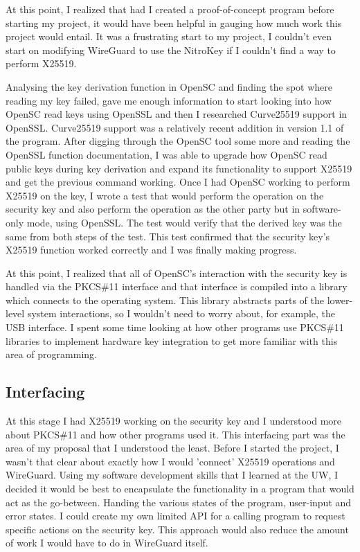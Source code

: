 \documentclass [11pt, proquest] {uwthesis}[2020/02/24]
\begin{document}
At this point, I realized that had I created a proof-of-concept program before starting my project, it would have been helpful in gauging how much work this project would entail. It was a frustrating start to my project, I couldn't even start on modifying WireGuard to use the NitroKey if I couldn't find a way to perform X25519.

Analysing the key derivation function in OpenSC and finding the spot where reading my key failed, gave me enough information to start looking into how OpenSC read keys using OpenSSL and then I researched Curve25519 support in OpenSSL. Curve25519 support was a relatively recent addition in version 1.1 of the program\cite{noauthor_support_nodate}.
After digging through the OpenSC tool some more and reading the OpenSSL function documentation, I was able to upgrade how OpenSC read public keys during key derivation and expand its functionality to support X25519 and get the previous command working.
Once I had OpenSC working to perform X25519 on the key, I wrote a test that would perform the operation on the security key and also perform the operation as the other party but in software-only mode, using OpenSSL. The test would verify that the derived key was the same from both steps of the test. This test confirmed that the security key's X25519 function worked correctly and I was finally making progress.

At this point, I realized that all of OpenSC's interaction with the security key is handled via the PKCS\#11 interface and that interface is compiled into a library which connects to the operating system. This library abstracts parts of the lower-level system interactions, so I wouldn't need to worry about, for example, the USB interface. I spent some time looking at how other programs use PKCS\#11 libraries to implement hardware key integration to get more familiar with this area of programming.

\subsection{Interfacing}
At this stage I had X25519 working on the security key and I understood more about PKCS\#11 and how other programs used it. This interfacing part was the area of my proposal that I understood the least. Before I started the project, I wasn't that clear about exactly how I would 'connect' X25519 operations and WireGuard. Using my software development skills that I learned at the UW, I decided it would be best to encapsulate the functionality in a program that would act as the go-between. Handing the various states of the program, user-input and error states. I could create my own limited API for a calling program to request specific actions on the security key. This approach would also reduce the amount of work I would have to do in WireGuard itself.
\end{document}

